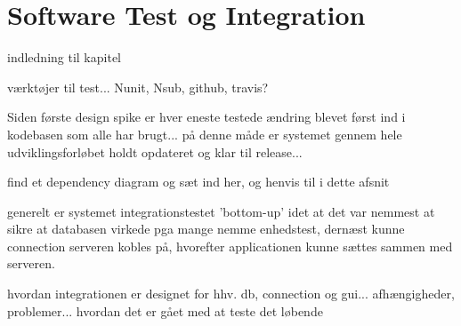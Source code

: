\chapter{Software Test og Integration}

 indledning til kapitel

 værktøjer til test... Nunit, Nsub, github, travis?

 Siden første design spike er hver eneste testede ændring blevet først ind i kodebasen som alle har brugt... på denne måde er systemet gennem hele udviklingsforløbet holdt opdateret og klar til release...

 find et dependency diagram og sæt ind her, og henvis til i dette afsnit

 generelt er systemet integrationstestet 'bottom-up' idet at det var nemmest at sikre at databasen virkede pga mange nemme enhedstest, dernæst kunne connection serveren kobles på, hvorefter applicationen kunne sættes sammen med serveren.

 hvordan integrationen er designet for hhv. db, connection og gui... afhængigheder, problemer... hvordan det er gået med at teste det løbende

%
%
%



